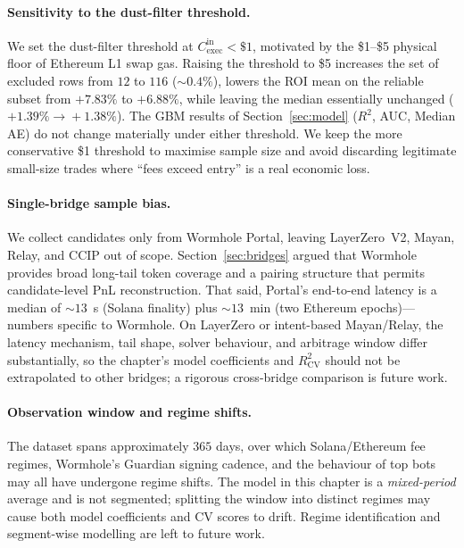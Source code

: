 \documentclass[sigconf,nonacm,10pt]{acmart}
\newcommand{\Cexec}{C_{\text{exec}}}
\begin{document}
\paragraph{Sensitivity to the dust-filter threshold.} We set the
dust-filter threshold at $\Cexec^{\text{in}}<\$1$, motivated by the
\$1--\$5 physical floor of Ethereum L1 swap gas. Raising the
threshold to \$5 increases the set of excluded rows from $12$ to
$116$ ($\sim 0.4\%$), lowers the ROI mean on the reliable
subset from $+7.83\%$ to $+6.88\%$, while leaving the median
essentially unchanged ($+1.39\%\!\to\!+1.38\%$). The GBM results of
Section~\ref{sec:model} ($R^2$, AUC, Median AE) do not
change materially under either threshold. We keep the more
conservative \$1 threshold to maximise sample size and avoid
discarding legitimate small-size trades where ``fees exceed
entry'' is a real economic loss.

\paragraph{Single-bridge sample bias.} We collect candidates only
from Wormhole Portal, leaving LayerZero~V2, Mayan, Relay, and CCIP
out of scope.
Section~\ref{sec:bridges} argued that Wormhole provides broad
long-tail token coverage and a pairing structure that permits
candidate-level PnL reconstruction. That said, Portal's end-to-end
latency is a median of $\sim\!13$~s (Solana finality) plus
$\sim\!13$~min (two Ethereum epochs)---numbers specific to Wormhole.
On LayerZero or intent-based Mayan/Relay, the latency mechanism, tail
shape, solver behaviour, and arbitrage window differ substantially,
so the chapter's model coefficients and $R^2_{\text{CV}}$ should not
be extrapolated to other bridges; a rigorous cross-bridge comparison
is future work.

\paragraph{Observation window and regime shifts.} The dataset spans
approximately $365$ days, over which Solana/Ethereum fee regimes,
Wormhole's Guardian signing cadence, and the behaviour of top bots
may all have undergone regime shifts. The model in this chapter is
a \emph{mixed-period} average and is not segmented; splitting the
window into distinct regimes may cause both model coefficients and
CV scores to drift. Regime identification and segment-wise modelling
are left to future work.
\end{document}
